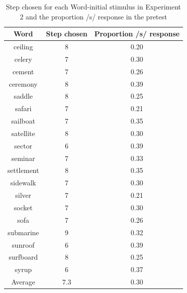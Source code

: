 \begin{table}
\caption{Step chosen for each Word-initial stimulus in Experiment 2 and the proportion /s/ response in the pretest}
\label{tbl:exp2srespinitial}
\centering
\begin{tabular}{ccc}
\toprule
 Word & Step chosen & Proportion /s/ response \\
\midrule
 ceiling & 8 & 0.20 \\
 celery & 7 & 0.30 \\
 cement & 7 & 0.26 \\
 ceremony & 8 & 0.39 \\
 saddle & 8 & 0.25 \\
 safari & 7 & 0.21 \\
 sailboat & 7 & 0.35 \\
satellite & 8 & 0.30 \\
 sector & 6 & 0.39 \\
 seminar & 7 & 0.33 \\
 settlement & 8 & 0.35 \\
 sidewalk & 7 & 0.30 \\
 silver & 7 & 0.21 \\
 socket & 7 & 0.30 \\
 sofa & 7 & 0.26 \\
 submarine & 9 & 0.32 \\
 sunroof & 6 & 0.39 \\
 surfboard & 8 & 0.25 \\
 syrup & 6 & 0.37 \\
\midrule
Average  & 7.3 & 0.30 \\

\bottomrule
\end{tabular}
\end{table}


